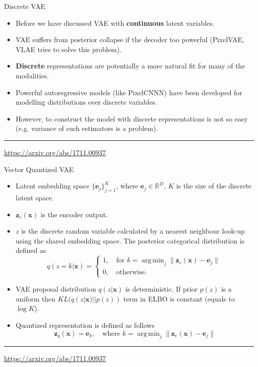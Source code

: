 \documentclass{beamer}
\newcommand{\be}{\mathbf{e}}
\newcommand{\bx}{\mathbf{x}}
\newcommand{\bz}{\mathbf{z}}
\newcommand{\bbR}{\mathbb{R}}
\DeclareMathOperator*{\argmin}{arg\,min}
\begin{document}
\begin{frame}{Discrete VAE}
	\begin{itemize}
		\item Before we have discussed VAE with \textbf{continuous} latent variables.
		\item VAE suffers from posterior collapse if the decoder too powerful (PixelVAE, VLAE tries to solve this problem).
		\item \textbf{Discrete} representations are potentially a more natural fit for many of the modalities.
		\item Powerful autoregressive models (like PixelCNNN) have been developed for modelling distributions over discrete variables.
		\item However, to construct the model with discrete representations is not so easy (e.g. variance of such estimators is a problem).
	\end{itemize}
	\vfill
	\hrule\medskip
	{\scriptsize \href{https://arxiv.org/abs/1711.00937}{https://arxiv.org/abs/1711.00937}} 
\end{frame}
\begin{frame}{Vector Quantized VAE}
	\begin{itemize}
		\item Latent embedding space $\{\be_j\}_{j=1}^K$, where $\be_j \in \bbR^D$, $K$ is the size of the discrete latent space.
		\item $\bz_e(\bx)$ is the encoder output.
		\item $z$ is the discrete random variable calculated by a nearest neighbour look-up using the shared embedding space. The posterior categorical distribution is defined as 
		\[
			q(z = k | \bx) = \begin{cases}
				1 , \quad \text{for } k = \argmin_j \| \bz_e(\bx) - \be_j \| \\
				0, \quad \text{otherwise}.
			\end{cases}
		\]
		
		\item VAE proposal distribution $q(z | \bx)$ is deterministic. If prior $p(z)$ is a uniform then $KL(q(z| \bx) || p(z))$ term in ELBO is constant (equals to $\log K$).
		\item Quantized representation is defined as follows
		\[
			\bz_q(\bx) = \be_k, \quad \text{where } k = \argmin_j \| \bz_e(\bx) - \be_j \| 
		\] 
		
	\end{itemize}
	\vfill
	\hrule\medskip
	{\scriptsize \href{https://arxiv.org/abs/1711.00937}{https://arxiv.org/abs/1711.00937}} 
\end{frame}
\end{document}
